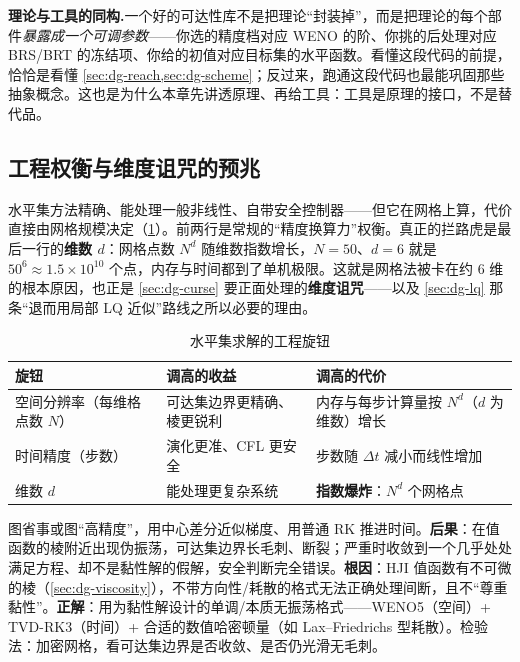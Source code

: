 \begin{insight}
\textbf{理论与工具的同构.}\;一个好的可达性库不是把理论“封装掉”，而是把理论的每个部件\emph{暴露成一个可调参数}——你选的精度档对应 WENO 的阶、你挑的后处理对应 BRS/BRT 的冻结项、你给的初值对应目标集的水平函数。看懂这段代码的前提，恰恰是看懂 \cref{sec:dg-reach,sec:dg-scheme}；反过来，跑通这段代码也最能巩固那些抽象概念。这也是为什么本章先讲透原理、再给工具：工具是原理的接口，不是替代品。
\end{insight}

\subsection{工程权衡与维度诅咒的预兆}
\label{sec:dg-tradeoff}
水平集方法精确、能处理一般非线性、自带安全控制器——但它在网格上算，代价直接由网格规模决定（\cref{tab:dg-knob}）。前两行是常规的“精度换算力”权衡。真正的拦路虎是最后一行的\textbf{维数 $d$}：网格点数 $N^d$ 随维数指数增长，$N=50$、$d=6$ 就是 $50^6\approx1.5\times10^{10}$ 个点，内存与时间都到了单机极限。这就是网格法被卡在约 6 维的根本原因，也正是 \cref{sec:dg-curse} 要正面处理的\textbf{维度诅咒}——以及 \cref{sec:dg-lq} 那条“退而用局部 LQ 近似”路线之所以必要的理由。

\begin{table}[H]\centering\small
\caption{水平集求解的工程旋钮}
\label{tab:dg-knob}
\begin{tabular}{p{} p{} p{}}
\toprule
旋钮 & 调高的收益 & 调高的代价 \\
\midrule
空间分辨率（每维格点数 $N$） & 可达集边界更精确、棱更锐利 & 内存与每步计算量按 $N^d$（$d$ 为维数）增长 \\
时间精度（步数） & 演化更准、CFL 更安全 & 步数随 $\Delta t$ 减小而线性增加 \\
维数 $d$ & 能处理更复杂系统 & \textbf{指数爆炸}：$N^d$ 个网格点 \\
\bottomrule
\end{tabular}
\end{table}

\begin{pitfall}
图省事或图“高精度”，用中心差分近似梯度、用普通 RK 推进时间。\textbf{后果}：在值函数的棱附近出现伪振荡，可达集边界长毛刺、断裂；严重时收敛到一个几乎处处满足方程、却不是黏性解的假解，安全判断完全错误。\textbf{根因}：HJI 值函数有不可微的棱（\cref{sec:dg-viscosity}），不带方向性/耗散的格式无法正确处理间断，且不“尊重黏性”。\textbf{正解}：用为黏性解设计的单调/本质无振荡格式——WENO5（空间）+ TVD-RK3（时间）+ 合适的数值哈密顿量（如 Lax--Friedrichs 型耗散）。检验法：加密网格，看可达集边界是否收敛、是否仍光滑无毛刺。
\end{pitfall}

